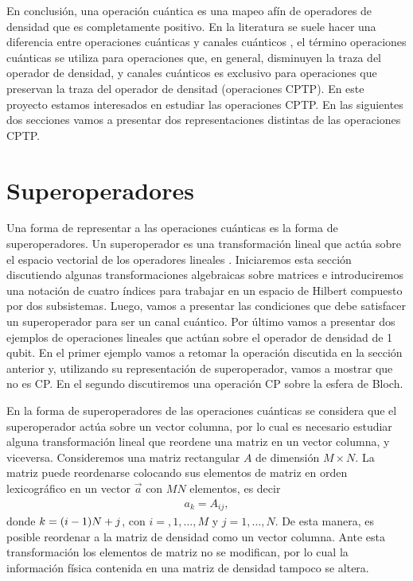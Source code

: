 
En conclusión, una operación cuántica es una mapeo afín de 
operadores de densidad que es completamente positivo. 
En la literatura se suele hacer una diferencia entre operaciones cuánticas
y canales cuánticos \cite{weedbrook2012gaussian}, el término operaciones 
cuánticas se utiliza para operaciones que, en general, disminuyen la traza 
del operador de densidad, y canales cuánticos es exclusivo para operaciones 
que preservan la traza del operador de densitad (operaciones CPTP). En 
este proyecto estamos interesados en estudiar las operaciones CPTP. 
En las siguientes dos secciones vamos a presentar dos representaciones
distintas de las operaciones CPTP. 



\section{Superoperadores}

Una forma de representar a las operaciones cuánticas es la forma de 
superoperadores. Un superoperador es una transformación lineal
que actúa sobre el espacio vectorial de los operadores lineales 
\cite{preskill1998lecture}. Iniciaremos esta sección discutiendo algunas
transformaciones algebraicas sobre matrices e introduciremos 
una notación de cuatro índices para trabajar en un espacio de Hilbert 
compuesto por dos subsistemas. Luego, vamos a presentar 
las condiciones que debe satisfacer un superoperador para ser un 
canal cuántico. Por último vamos a presentar dos ejemplos de operaciones
lineales que actúan sobre el operador de densidad de 1 qubit. En el primer 
ejemplo vamos a retomar la operación discutida en la sección anterior y, 
utilizando su representación de superoperador, vamos a mostrar que no es CP. 
En el segundo discutiremos una operación CP sobre la esfera de Bloch. 

En la forma de superoperadores de las operaciones cuánticas se 
considera que el superoperador actúa sobre
un vector columna, por lo cual es necesario estudiar alguna transformación
lineal que reordene una matriz en un vector columna, y viceversa.
Consideremos una matriz rectangular $A$ de dimensión $M\times N$.
La matriz puede reordenarse colocando sus elementos de matriz en 
orden lexicográfico en un vector $\vec{a}$ con $MN$ elementos, es decir
\begin{align}
a_k=A_{ij}, 
\label{eq:matrix-to-vector}
\end{align}
donde $k=\qty(i-1)N+j$, con $i=,1,\ldots,M$ y $j=1,\ldots,N$. De
esta manera, es posible reordenar a la matriz de densidad como un 
vector columna. Ante esta transformación los elementos de matriz no se 
modifican, por lo cual la información física contenida en una matriz 
de densidad tampoco se altera.

